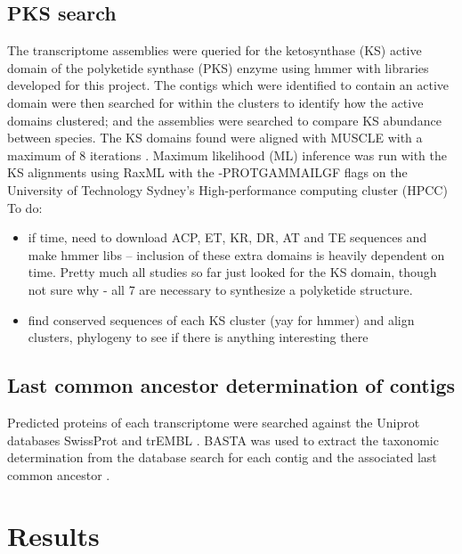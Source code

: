\documentclass[12pt]{article}
\begin{document}
\subsection*{PKS search}
The transcriptome assemblies were queried for the ketosynthase (KS) active domain of the polyketide synthase (PKS) enzyme using hmmer \cite{eddy2015hmmer} with libraries developed for this project. 
The contigs which were identified to contain an active domain were then searched for within the clusters to identify how the active domains clustered; and the assemblies were searched to compare KS abundance between species. 
The KS domains found were aligned with MUSCLE with a maximum of 8 iterations \cite{edgar2004muscle}. 
Maximum likelihood (ML) inference was run with the KS alignments using RaxML \cite{stamatakis2014raxml} with the -PROTGAMMAILGF flags on the University of Technology Sydney’s High-performance computing cluster (HPCC)\\
To do:
\begin{itemize}
\item if time, need to download ACP, ET, KR, DR, AT and TE sequences and make hmmer libs -- inclusion of these extra domains is heavily dependent on time. 
Pretty much all studies so far just looked for the KS domain, though not sure why - all 7 are necessary to synthesize a polyketide structure.
\item find conserved sequences of each KS cluster (yay for hmmer) and align clusters, phylogeny to see if there is anything interesting there 
\end{itemize}

\subsection*{Last common ancestor determination of contigs}
Predicted proteins of each transcriptome were searched against the Uniprot databases SwissProt and trEMBL \cite{uniprot2010ongoing}. 
BASTA was used to extract the taxonomic determination from the database search for each contig and the associated last common ancestor  \cite{kahlke2018basta}.

\newpage
\section*{Results}
\FloatBarrier
\end{document}
